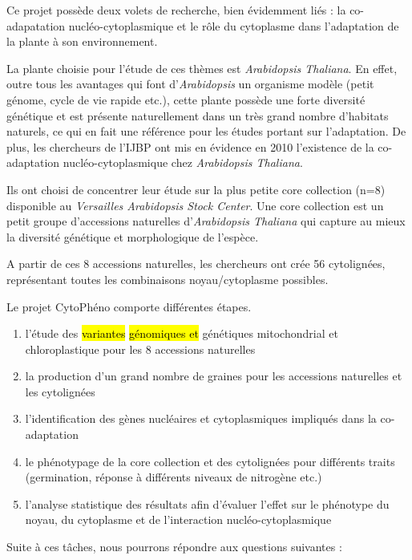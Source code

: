 \documentclass[a4paper]{article}
\newcommand{\add}[1]{\todo[color=cyan!40]{#1}}
\newcommand{\rewrite}[1]{\todo[color=green!40]{#1}}
\newcommand{\hladd}[1]{\sethlcolor{cyan} \hl{#1} \add{#1}}
\newcommand{\hlrewrite}[2]{\sethlcolor{green} \hl{#1} \rewrite{#2}}
\begin{document}
Ce projet possède deux volets de recherche, bien évidemment liés : la co-adapatation nucléo-cytoplasmique et le rôle du cytoplasme dans l'adaptation de la plante à son environnement. 

La plante choisie pour l'étude de ces thèmes est \textit{Arabidopsis Thaliana}. En effet, outre tous les avantages qui font d'\textit{Arabidopsis} un organisme modèle (petit génome, cycle de vie rapide etc.), cette plante possède une forte diversité génétique et est présente naturellement dans un très grand nombre d'habitats naturels, ce qui en fait une référence pour les études portant sur l'adaptation. De plus, les chercheurs de l'IJBP ont mis en évidence en 2010 l'existence de la co-adaptation nucléo-cytoplasmique chez \textit{Arabidopsis Thaliana}.\cite{moison2010cytoplasmic}

Ils ont choisi de concentrer leur étude sur la plus petite core collection (n=8) disponible au \textit{Versailles Arabidopsis Stock Center}. Une core collection est un petit groupe d'accessions naturelles d'\textit{Arabidopsis Thaliana} qui capture au mieux la diversité génétique et morphologique de l'espèce.\cite{mckhann2004nested}

A partir de ces 8 accessions naturelles, les chercheurs ont crée 56 cytolignées, représentant toutes les combinaisons noyau/cytoplasme possibles. 

Le projet CytoPhéno comporte différentes étapes.

\begin{enumerate}
	\item l'étude des \hlrewrite{variantes}{variations} \hladd{génomiques et} génétiques mitochondrial et chloroplastique pour les 8 accessions naturelles
\item la production d'un grand nombre de graines pour les accessions naturelles et les cytolignées
\item l'identification des gènes nucléaires et cytoplasmiques impliqués dans la co-adaptation  
\item le phénotypage de la core collection et des cytolignées pour différents traits (germination, réponse à différents niveaux de nitrogène etc.)
\item l'analyse statistique des résultats afin d'évaluer l'effet sur le phénotype du noyau, du cytoplasme et de l'interaction nucléo-cytoplasmique
\end{enumerate}

Suite à ces tâches, nous pourrons répondre aux questions suivantes :  
\end{document}
